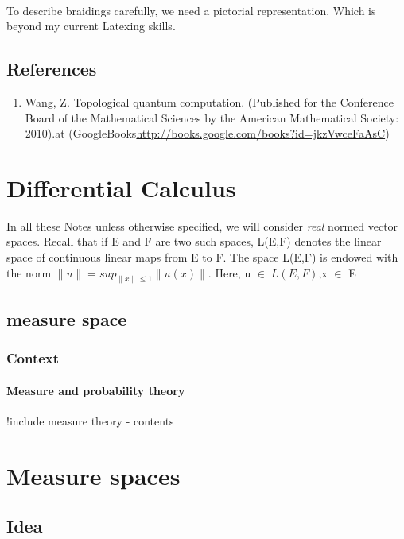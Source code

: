\documentclass[preprint, 5p, 10pt]{elsarticle}
\theoremstyle{plain}
\begin{document}
\paragraph{} To describe braidings carefully, we need a pictorial representation. Which is beyond my current Latexing skills.   
\subsection{References}
\begin{enumerate}
\item Wang, Z. Topological quantum computation. (Published for the Conference Board of the Mathematical Sciences by the American Mathematical Society: 2010).at (GoogleBooks\url{http://books.google.com/books?id=jkzVwceFaAsC})
\end{enumerate}
\section{Differential Calculus}
In all these Notes unless otherwise specified, we will consider \textit{real} normed vector spaces. Recall that if E and F are two such
spaces, L(E,F) denotes the linear space of continuous linear maps from E to F. The space L(E,F) is endowed with the norm 
$\|u\| = sup_{\|x\|\leq 1}\|u(x)\|$. Here, u $\in\;L(E,F)$,x $\in$ E
\subsection{measure space}

\subsubsection*{{Context}}

\hypertarget{measure_and_probability_theory_2}{}\paragraph*{{Measure and probability theory}}\label{measure_and_probability_theory_2}

!include measure theory - contents

\hypertarget{measure_spaces_3}{}\section*{{Measure spaces}}



\hypertarget{idea_4}{}\subsection*{{Idea}}
\end{document}
